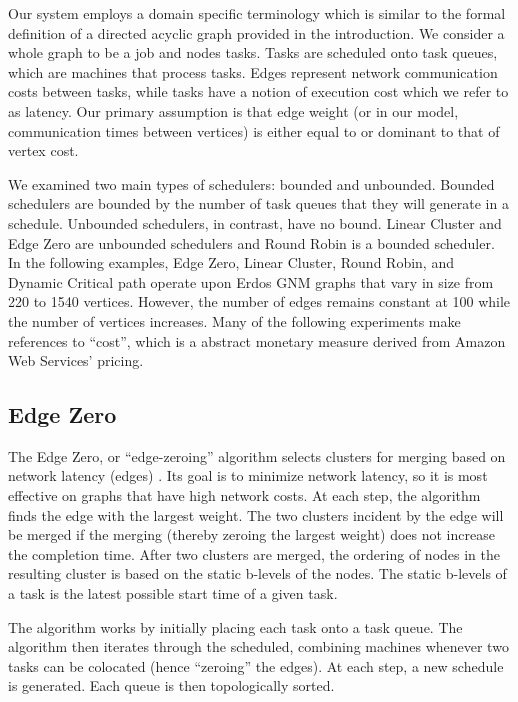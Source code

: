 \documentclass[11pt, oneside]{article}   	%
\begin{document}
Our system employs a domain specific terminology which is similar to the formal definition of a directed acyclic graph provided in the introduction. We consider a whole graph to be a job and nodes tasks. Tasks are scheduled onto task queues, which are machines that process tasks. Edges represent network communication costs between tasks, while tasks have a notion of execution cost which we refer to as latency. Our primary assumption is that edge weight (or in our model, communication times between vertices) is either equal to or dominant to that of vertex cost.

We examined two main types of schedulers: bounded and unbounded. Bounded schedulers are bounded by the number of task queues that they will generate in a schedule. Unbounded schedulers, in contrast, have no bound. Linear Cluster and Edge Zero are unbounded schedulers and Round Robin is a bounded scheduler. In the following examples, Edge Zero, Linear Cluster, Round Robin, and Dynamic Critical path operate upon Erdos GNM graphs that vary in size from 220 to 1540 vertices. However, the number of edges remains constant at 100 while the number of vertices increases. Many of the following experiments make references to ``cost'', which is a abstract monetary measure derived from Amazon Web Services' pricing.

\subsection{Edge Zero}

The Edge Zero, or ``edge-zeroing'' algorithm selects clusters for merging based on network latency (edges) \cite{lit-review}\cite{edge-zero}. Its goal is to minimize network latency, so it is most effective on graphs that have high network costs. At each step, the algorithm finds the edge with the largest weight. The two clusters incident by the edge will be merged if the merging (thereby zeroing the largest weight) does not increase the completion time. After two clusters are merged, the ordering of nodes in the resulting cluster is based on the static b-levels of the nodes. The static b-levels of a task is the latest possible start time of a given task.

The algorithm works by initially placing each task onto a task queue. The algorithm then iterates through the scheduled, combining machines whenever two tasks can be colocated (hence ``zeroing'' the edges). At each step, a new schedule is generated. Each queue is then topologically sorted. 
\end{document}
